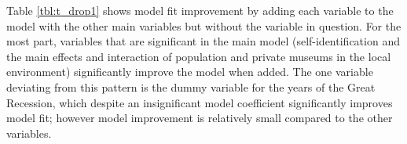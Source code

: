 \documentclass[12pt]{article}
\begin{document}
Table \ref{tbl:t_drop1} shows model fit improvement by adding each variable to the model with the other main variables but without the variable in question.
For the most part, variables that are significant in the main model (self-identification and the main effects and interaction of population and private museums in the local environment) significantly improve the model when added.
The one variable deviating from this pattern is the dummy variable for the years of the Great Recession, which despite an insignificant model coefficient significantly improves model fit; however model improvement is relatively small compared to the other variables. 
\end{document}
